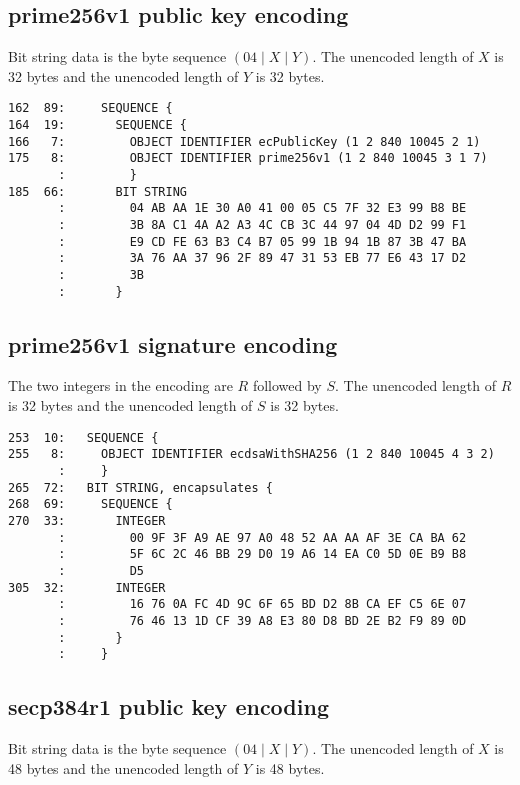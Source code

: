 \documentclass[12pt]{article}
\begin{document}
\newpage
\subsection*{prime256v1 public key encoding}

\noindent
Bit string data is the byte sequence $(04\mid X\mid Y)$.
The unencoded length of $X$ is 32 bytes and the unencoded length of $Y$ is 32 bytes.

\begin{verbatim}
162  89:     SEQUENCE {
164  19:       SEQUENCE {
166   7:         OBJECT IDENTIFIER ecPublicKey (1 2 840 10045 2 1)
175   8:         OBJECT IDENTIFIER prime256v1 (1 2 840 10045 3 1 7)
       :         }
185  66:       BIT STRING
       :         04 AB AA 1E 30 A0 41 00 05 C5 7F 32 E3 99 B8 BE
       :         3B 8A C1 4A A2 A3 4C CB 3C 44 97 04 4D D2 99 F1
       :         E9 CD FE 63 B3 C4 B7 05 99 1B 94 1B 87 3B 47 BA
       :         3A 76 AA 37 96 2F 89 47 31 53 EB 77 E6 43 17 D2
       :         3B
       :       }
\end{verbatim}

\subsection*{prime256v1 signature encoding}

\noindent
The two integers in the encoding are $R$ followed by $S$.
The unencoded length of $R$ is 32 bytes and the unencoded length of $S$ is 32 bytes.

\begin{verbatim}
253  10:   SEQUENCE {
255   8:     OBJECT IDENTIFIER ecdsaWithSHA256 (1 2 840 10045 4 3 2)
       :     }
265  72:   BIT STRING, encapsulates {
268  69:     SEQUENCE {
270  33:       INTEGER
       :         00 9F 3F A9 AE 97 A0 48 52 AA AA AF 3E CA BA 62
       :         5F 6C 2C 46 BB 29 D0 19 A6 14 EA C0 5D 0E B9 B8
       :         D5
305  32:       INTEGER
       :         16 76 0A FC 4D 9C 6F 65 BD D2 8B CA EF C5 6E 07
       :         76 46 13 1D CF 39 A8 E3 80 D8 BD 2E B2 F9 89 0D
       :       }
       :     }
\end{verbatim}

\newpage
\subsection*{secp384r1 public key encoding}

\noindent
Bit string data is the byte sequence $(04\mid X\mid Y)$.
The unencoded length of $X$ is 48 bytes and the unencoded length of $Y$ is 48 bytes.
\end{document}
